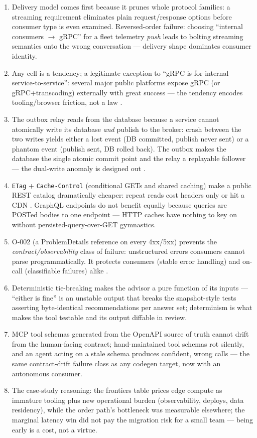 \begin{enumerate}[leftmargin=2.2em]
  \item Delivery model comes first because it prunes whole protocol
    families: a streaming requirement eliminates plain request/response
    options before consumer type is even examined. Reversed-order failure:
    choosing ``internal consumers $\to$ gRPC'' for a fleet telemetry
    \emph{push} leads to bolting streaming semantics onto the wrong
    conversation --- delivery shape dominates consumer identity.
  \item Any cell is a tendency; a legitimate exception to ``gRPC is for
    internal service-to-service'': several major public platforms expose
    gRPC (or gRPC+transcoding) externally with great success --- the
    tendency encodes tooling/browser friction, not a law
    \cite{grpcdocs}.
  \item The outbox relay reads from the database because a service cannot
    atomically write its database \emph{and} publish to the broker: crash
    between the two writes yields either a lost event (DB committed,
    publish never sent) or a phantom event (publish sent, DB rolled back).
    The outbox makes the database the single atomic commit point and the
    relay a replayable follower --- the dual-write anomaly is designed out
    \cite{kleppmann2017ddia}.
  \item \texttt{ETag} + \texttt{Cache-Control} (conditional GETs and shared
    caching) make a public REST catalog dramatically cheaper: repeat reads
    cost headers only or hit a CDN \cite{rfc9110}. GraphQL endpoints do not
    benefit equally because queries are POSTed bodies to one endpoint ---
    HTTP caches have nothing to key on without persisted-query-over-GET
    gymnastics.
  \item O-002 (a ProblemDetails reference on every 4xx/5xx) prevents the
    \emph{contract/observability} class of failure: unstructured errors
    consumers cannot parse programmatically. It protects consumers (stable
    error handling) and on-call (classifiable failures) alike
    \cite{rfc9457}.
  \item Deterministic tie-breaking makes the advisor a pure function of its
    inputs --- ``either is fine'' is an unstable output that breaks the
    snapshot-style tests asserting byte-identical recommendations per
    answer set; determinism is what makes the tool testable and its output
    diffable in review.
  \item MCP tool schemas generated from the OpenAPI source of truth cannot
    drift from the human-facing contract; hand-maintained tool schemas rot
    silently, and an agent acting on a stale schema produces confident,
    wrong calls --- the same contract-drift failure class as any codegen
    target, now with an autonomous consumer.
  \item The case-study reasoning: the frontiers table prices edge compute
    as immature tooling plus new operational burden (observability,
    deploys, data residency), while the order path's bottleneck was
    measurable elsewhere; the marginal latency win did not pay the
    migration risk for a small team --- being early is a cost, not a
    virtue.
\end{enumerate}

